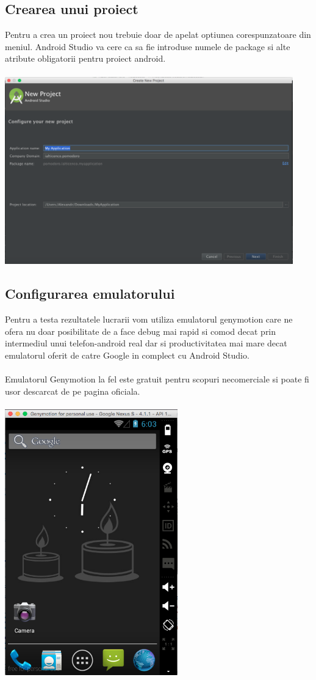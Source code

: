 \documentclass[12pt]{article}
\begin{document}
\subsection{Crearea unui proiect}
Pentru a crea un proiect nou trebuie doar de apelat optiunea corespunzatoare din meniul. Android Studio va cere ca sa fie introduse numele de package si alte atribute obligatorii pentru proiect android. \\
\\
\includegraphics[width=12.5cm]{images/2}
\subsection{Configurarea emulatorului}
Pentru a testa rezultatele lucrarii vom utiliza emulatorul genymotion care ne ofera nu doar posibilitate de a face debug mai rapid si comod decat prin intermediul unui telefon-android real dar si productivitatea mai mare decat emulatorul oferit de catre Google in complect cu Android Studio. \\\\
Emulatorul Genymotion la fel este gratuit pentru scopuri necomerciale si poate fi usor descarcat de pe pagina oficiala.\\\\
\includegraphics[height=11.5cm]{images/3}\\
\end{document}
